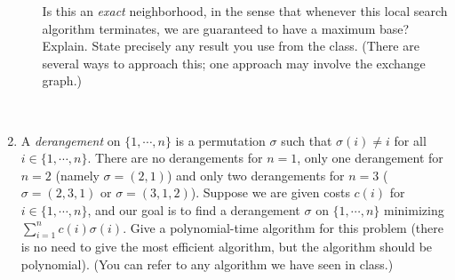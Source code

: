 \documentclass[12pt]{article}
\begin{document}
\begin{enumerate}
\begin{enumerate}
Is this an {\it exact} neighborhood, in the sense that whenever this
local search algorithm terminates, we are guaranteed to have a maximum
base? Explain. State precisely any result you use from the class.
(There are several ways to approach this; one approach may involve the
exchange graph.) 

\end{enumerate}
\newpage
~

\newpage
\item
A {\it derangement} on $\{1,\cdots, n\}$ is a permutation $\sigma$ such that $\sigma(i)\neq i$ for all $i\in\{1,\cdots,n\}$. There are no derangements for $n=1$, only one derangement for $n=2$ (namely $\sigma=(2,1)$) and only two derangements for  
$n=3$ ($\sigma=(2,3,1)$ or $\sigma=(3,1,2)$). Suppose we are given costs $c(i)$ for $i\in\{1,\cdots,n\}$, and our goal is to find  a derangement $\sigma$ on $\{1,\cdots, n\}$ minimizing $\sum_{i=1}^n c(i) \sigma(i)$. Give a polynomial-time  algorithm for this problem (there is no need to give the most efficient algorithm, but the algorithm should be polynomial). (You can refer to any algorithm we have seen in class.)  

\end{enumerate}
\newpage
~
\newpage
~
\newpage
~
\end{document}
